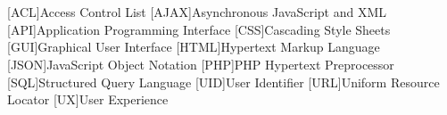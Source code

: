 \documentclass[
  11pt, %
  oneside, %
  ngerman, %
  singlespacing, %
  liststotoc, %
  headsepline, %
  chapterinoneline, %
]{MastersDoctoralThesis} %
\begin{document}
\chapter{\abbrevname}
\begin{acronym}[AAAAAA]
  [ACL]{Access Control List}
  [AJAX]{Asynchronous JavaScript and XML}
  [API]{Application Programming Interface}
  [CSS]{Cascading Style Sheets}
  [GUI]{Graphical User Interface}
  [HTML]{Hypertext Markup Language}
  [JSON]{JavaScript Object Notation}
  [PHP]{PHP Hypertext Preprocessor}
  [SQL]{Structured Query Language}
  [UID]{User Identifier}
  [URL]{Uniform Resource Locator}
  [UX]{User Experience}
\end{acronym}



\mainmatter %

\pagestyle{thesis} %










\appendix %


% 
% 
% 



\printbibliography[heading=bibintoc]

\end{document}

